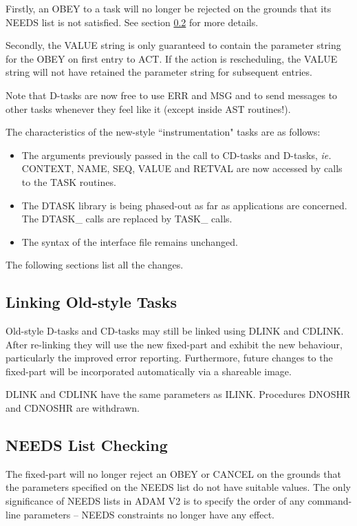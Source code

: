 Firstly, an OBEY to a task will no longer be rejected on the grounds 
that its NEEDS list is not satisfied. See section \ref{needs} for more details.

Secondly, the VALUE string is only guaranteed to contain the parameter 
string for the OBEY on first entry to ACT. If the action is 
rescheduling, the VALUE string will not have retained the parameter 
string for subsequent entries.

Note that D-tasks are now free to use ERR and MSG and to send messages
to other tasks whenever they feel like it (except inside AST routines!).

The characteristics of the new-style ``instrumentation" tasks are as 
follows:
\begin{itemize}
\item The arguments previously passed in the call to CD-tasks and D-tasks, 
{\em ie.} CONTEXT, NAME, SEQ, VALUE and RETVAL are now accessed by calls to the
TASK routines. 
\item The DTASK library is being phased-out as far as applications are 
concerned. The DTASK\_ calls are replaced by TASK\_ calls.
\item The syntax of the interface file remains unchanged.
\end{itemize}
The following sections list all the changes.

\subsection{Linking Old-style Tasks}
Old-style D-tasks and CD-tasks may still be linked using DLINK and CDLINK.
After re-linking they will use the new fixed-part and exhibit the new
behaviour, particularly the improved error reporting. Furthermore, future 
changes to the fixed-part will be incorporated automatically via a shareable 
image.

DLINK and CDLINK have the same parameters as ILINK. Procedures DNOSHR and
CDNOSHR are withdrawn.

\subsection{NEEDS List Checking}
\label{needs}
The fixed-part will no longer reject an OBEY or CANCEL on the grounds 
that the parameters specified on the NEEDS list do not have suitable 
values.
The only significance of NEEDS lists in ADAM V2 is to specify the order of any
command-line parameters -- NEEDS constraints no longer have any effect.

